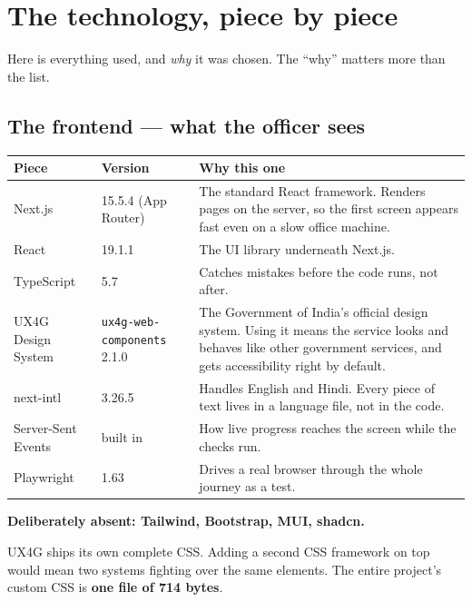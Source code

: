 \documentclass[11pt,a4paper]{article}
\newcommand{\keyline}[1]{%
  \par\vspace{4pt}%
  \noindent\colorbox{shade}{\parbox{\dimexpr\linewidth-2\fboxsep}{\textbf{#1}}}%
  \par\vspace{6pt}%
}
\begin{document}
\newpage

\section{The technology, piece by piece}

Here is everything used, and \emph{why} it was chosen. The ``why'' matters more
than the list.

\subsection{The frontend --- what the officer sees}

\begin{longtable}{@{}p{3.4cm}p{4.0cm}p{7.6cm}@{}}
\toprule
\textbf{Piece} & \textbf{Version} & \textbf{Why this one} \\
\midrule
\endhead
Next.js & 15.5.4 (App Router) & The standard React framework. Renders pages on
the server, so the first screen appears fast even on a slow office machine. \\

React & 19.1.1 & The UI library underneath Next.js. \\

TypeScript & 5.7 & Catches mistakes before the code runs, not after. \\

UX4G Design System & \texttt{ux4g-web-components} 2.1.0 & The Government of
India's official design system. Using it means the service looks and behaves
like other government services, and gets accessibility right by default. \\

next-intl & 3.26.5 & Handles English and Hindi. Every piece of text lives in a
language file, not in the code. \\

Server-Sent Events & built in & How live progress reaches the screen while the
checks run. \\

Playwright & 1.63 & Drives a real browser through the whole journey as a test. \\
\bottomrule
\end{longtable}

\keyline{Deliberately absent: Tailwind, Bootstrap, MUI, shadcn.}

UX4G ships its own complete CSS. Adding a second CSS framework on top would
mean two systems fighting over the same elements. The entire project's custom
CSS is \textbf{one file of 714 bytes}.
\end{document}
